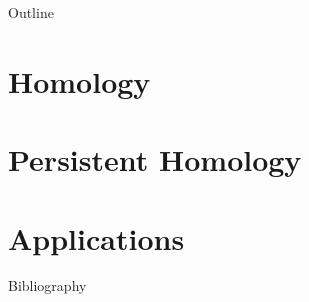 






\begin{frame}
    \titlepage
\end{frame}

\begin{frame}{Outline}
	\tableofcontents
\end{frame}

\section[Homology]{Homology}
\begin{frame}

\end{frame}


\section[Persistence]{Persistent Homology}
\begin{frame}

\end{frame}

\section{Applications}
\begin{frame}

\end{frame}

\begin{frame}{Bibliography}
	
\end{frame}





